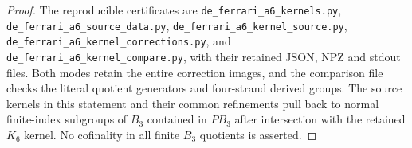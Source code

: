 \begin{proof}
The reproducible certificates are
\texttt{de\_ferrari\_a6\_kernels.py},
\texttt{de\_ferrari\_a6\_source\_data.py},
\texttt{de\_ferrari\_a6\_kernel\_source.py},
\texttt{de\_ferrari\_a6\_kernel\_corrections.py}, and
\texttt{de\_ferrari\_a6\_kernel\_compare.py}, with their
retained JSON, NPZ and stdout files.  Both modes retain the
entire correction images, and the comparison file checks the
literal quotient generators and four-strand derived groups.
The source kernels in this statement and their common
refinements pull back to normal finite-index subgroups of
$B_3$ contained in $PB_3$ after intersection with the retained
$K_6$ kernel.  No cofinality in all finite $B_3$ quotients is
asserted.
\end{proof}
